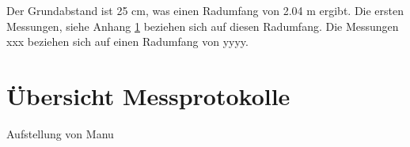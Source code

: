 Der Grundabstand ist 25 cm, was einen Radumfang von 2.04 m ergibt. Die ersten Messungen, siehe Anhang \ref{uebersicht_messprotokolle} beziehen sich auf diesen Radumfang. Die Messungen xxx beziehen sich auf einen Radumfang von yyyy.

\chapter{Übersicht Messprotokolle}
\label{uebersicht_messprotokolle}

Aufstellung von Manu

%
%
%
%
%
